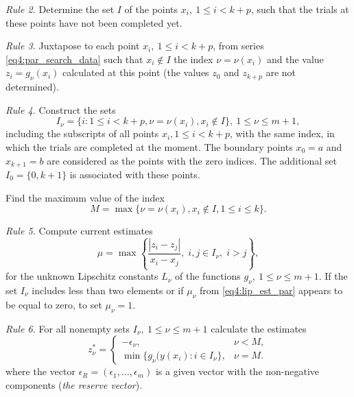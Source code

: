 \emph{Rule 2.} Determine the set $I$ of the points $x_i,\: 1\le i<k+p$, such that the trials at these points have not been completed yet.

\emph{Rule 3.} Juxtapose to each point $x_i,\: 1\le i<k+p$, from series \eqref{eq4:par_search_data} such that $x_i\not\in I$ the
index $\nu=\nu(x_i)$ and the value $z_i=g_\nu(x_i )$ calculated at this point (the values $z_0$ and $z_{k + p}$ are not determined).

\emph{Rule 4.} Construct the sets
\begin{equation}
  I_\nu=\{i:1\le i<k+p, \nu=\nu(x_i),x_i\not\in I\},\:1\le\nu\le m+1,
\end{equation}
including the subscripts of all points $x_i ,1\le i<k+p$, with the same index, in which the trials are completed at the moment. The boundary points $x_0=a$ and $x_{k + 1}=b$ are considered as the points with the zero indices. The additional set $I_0=\{0,k+1\}$ is associated with these points.

Find the maximum value of the index
\begin{equation}
  M=\max\{\nu=\nu(x_i),x_i\not\in I,1\le i \le k\}.
\end{equation}

\emph{Rule 5.} Compute current estimates
\begin{equation}
  \label{eq4:lip_est_par}
  \mu = \max\left\{ \frac{\left|z_i-z_j\right|}{ x_i - x_j }, \; i,j \in I_\nu, \; i>j \right\},
\end{equation}
for the unknown Lipschitz constants $L_\nu$ of the functions $g_\nu,\: 1\le\nu\le m+1$. If the set $I_\nu$ includes less than two elements or if $\mu_\nu$ from \eqref{eq4:lip_est_par} appears to be equal to zero, to set $\mu_\nu=1$.

\emph{Rule 6.} For all nonempty sets $I_\nu,\: 1\le\nu\le m+1$ calculate the estimates
\begin{equation}
  \label{eq4:z_const_par}
  z_\nu^\ast = \left\{
  \begin{array}{lr}
    -\epsilon_\nu, & \nu < M,\\
    \min\{ g_\nu(y(x_i): i\in I_\nu \}, & \nu = M.
  \end{array}
  \right.
\end{equation}
where the vector $\epsilon_R=(\epsilon_1 ,\dots, \epsilon_m )$ is a given vector with the non-negative components (\emph{the reserve vector}).

